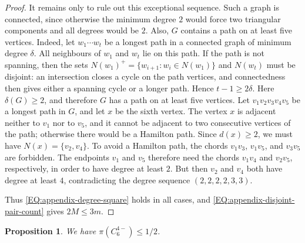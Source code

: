 \documentclass[10pt,a4paper]{article}
\theoremstyle{plain}
\newtheorem{proposition}[proposition]{Proposition}
\theoremstyle{definition}
\begin{document}
\begin{proof}
It remains only to rule out this exceptional sequence.
Such a graph is connected, since otherwise the minimum degree $2$ would force two triangular components and all degrees would be $2$.
Also, $G$ contains a path on at least five vertices.
Indeed, let $w_1\cdots w_t$ be a longest path in a connected graph of minimum degree $\delta$.
All neighbours of $w_1$ and $w_t$ lie on this path.
If the path is not spanning, then the sets $N(w_1)^+=\{w_{i+1}:w_i\in N(w_1)\}$ and $N(w_t)$ must be disjoint: an intersection closes a cycle on the path vertices, and connectedness then gives either a spanning cycle or a longer path.
Hence $t-1\ge2\delta$.
Here $\delta(G)\ge2$, and therefore $G$ has a path on at least five vertices.
Let $v_1v_2v_3v_4v_5$ be a longest path in $G$, and let $x$ be the sixth vertex.
The vertex $x$ is adjacent neither to $v_1$ nor to $v_5$, and it cannot be adjacent to two consecutive vertices of the path; otherwise there would be a Hamilton path.
Since $d(x)\ge2$, we must have $N(x)=\{v_2,v_4\}$.
To avoid a Hamilton path, the chords $v_1v_3$, $v_1v_5$, and $v_3v_5$ are forbidden.
The endpoints $v_1$ and $v_5$ therefore need the chords $v_1v_4$ and $v_2v_5$, respectively, in order to have degree at least $2$.
But then $v_2$ and $v_4$ both have degree at least $4$, contradicting the degree sequence $(2,2,2,2,3,3)$.

Thus \eqref{EQ:appendix-degree-square} holds in all cases, and \eqref{EQ:appendix-disjoint-pair-count} gives $2M\le3m$.
\end{proof}

\begin{proposition}\label{PROP:appendix-C6minus-upper}
We have $\pi(C_6^{4-})\le1/2$.
\end{proposition}
\end{document}
